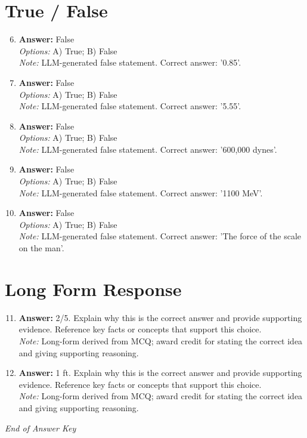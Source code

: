 \documentclass[12pt]{article}
\begin{document}
\section*{True / False}
\begin{enumerate}[label=\arabic*.]
\setcounter{enumi}{5}
\item \textbf{Answer:} False
\\ \textit{Options:} A) True; B) False
\\ \textit{Note:} LLM-generated false statement. Correct answer: '0.85'.
\item \textbf{Answer:} False
\\ \textit{Options:} A) True; B) False
\\ \textit{Note:} LLM-generated false statement. Correct answer: '5.55'.
\item \textbf{Answer:} False
\\ \textit{Options:} A) True; B) False
\\ \textit{Note:} LLM-generated false statement. Correct answer: '600,000 dynes'.
\item \textbf{Answer:} False
\\ \textit{Options:} A) True; B) False
\\ \textit{Note:} LLM-generated false statement. Correct answer: '1100 MeV'.
\item \textbf{Answer:} False
\\ \textit{Options:} A) True; B) False
\\ \textit{Note:} LLM-generated false statement. Correct answer: 'The force of the scale on the man'.
\end{enumerate}

\section*{Long Form Response}
\begin{enumerate}[label=\arabic*.]
\setcounter{enumi}{10}
\item \textbf{Answer:} 2/5. Explain why this is the correct answer and provide supporting evidence. Reference key facts or concepts that support this choice.
\\ \textit{Note:} Long-form derived from MCQ; award credit for stating the correct idea and giving supporting reasoning.
\item \textbf{Answer:} 1 ft. Explain why this is the correct answer and provide supporting evidence. Reference key facts or concepts that support this choice.
\\ \textit{Note:} Long-form derived from MCQ; award credit for stating the correct idea and giving supporting reasoning.
\end{enumerate}

\vfill
\noindent\textit{End of Answer Key}
\end{document}
